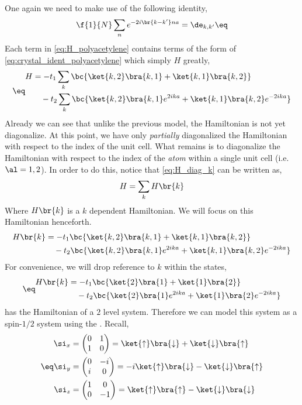 \documentclass{article}
\begin{document}
One again we need to make use of the following identity,
\[ \f{1}{N} \sum_{n}e^{-2i \br{k - k'}na} = \de_{k, k'} \eq \label{eq:crystal_ident_polyacetylene}\]
Each term in \cref{eq:H_polyacetylene} contains terms of the form of \cref{eq:crystal_ident_polyacetylene} which simply $H$ greatly,
\begin{align*}
\eq\label{eq:H_diag_k}
\begin{split}
H
&= - t_1 \sum_{k}\bc{\ket{k ,2} \bra{k, 1} + \ket{k, 1}\bra{k,2}} \\
&\quad - t_2 \sum_{k}\bc{\ket{k ,2} \bra{k, 1}e^{2ika} + \ket{k, 1}\bra{k,2}e^{-2ika}}
\end{split}
\end{align*}
Already we can see that unlike the previous model, the Hamiltonian is not yet diagonalize. At this point, we have only \textit{partially} diagonalized the Hamiltonian with respect to the index of the unit cell. What remains is to diagonalize the Hamiltonian with respect to the index of the \textit{atom} within a single unit cell (i.e. $\al = 1,2$). In order to do this, notice that \cref{eq:H_diag_k} can be written as,
\[ H = \sum_{k} H\br{k} \]
Where $H\br{k}$ is a $k$ dependent Hamiltonian. We will focus on this Hamiltonian henceforth.
\begin{align*}
\begin{split}
H\br{k}
&= - t_1 \bc{\ket{k ,2} \bra{k, 1} + \ket{k, 1}\bra{k,2}} \\
&\quad - t_2 \bc{\ket{k ,2} \bra{k, 1}e^{2ika} + \ket{k, 1}\bra{k,2}e^{-2ika}}
\end{split}
\end{align*}
For convenience, we will drop reference to $k$ within the states,
\begin{align*}
\eq\label{eq:H_of_k}
\begin{split}
H\br{k}
&= - t_1 \bc{\ket{2} \bra{1} + \ket{1}\bra{2}} \\
&\quad - t_2 \bc{\ket{2} \bra{1}e^{2ika} + \ket{1}\bra{2}e^{-2ika}}
\end{split}
\end{align*}
 has the Hamiltonian of a $2$ level system. Therefore we can model this system as a spin-$1/2$ system using the . Recall,
\begin{align*}
\eq \label{eq:pauli_matrices}
\begin{split}
\si_x &= \begin{pmatrix} 0 & 1 \\ 1 & 0 \end{pmatrix} = \ket{\uparrow} \bra{\downarrow} + \ket{\downarrow} \bra{\uparrow} \\
\si_y &= \begin{pmatrix} 0 & -i \\ i & 0 \end{pmatrix} = -i\ket{\uparrow} \bra{\downarrow} - \ket{\downarrow} \bra{\uparrow} \\
\si_z &= \begin{pmatrix} 1 & 0 \\ 0 & -1 \end{pmatrix} = \ket{\uparrow} \bra{\uparrow} - \ket{\downarrow} \bra{\downarrow}
\end{split}
\end{align*}
\end{document}
